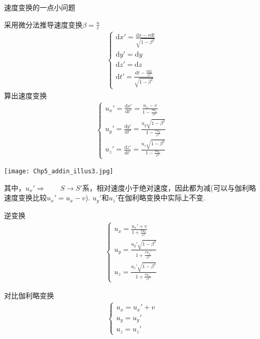 \documentclass[a4paper, opensource]{./template/qyxf-book}
\newcommand{\di}[1]{\mathrm{d}#1}
\begin{document}
\begin{section}{速度变换的一点小问题}
\begin{multicols}{2}
采用微分法推导速度变换\hspace{2em}$\beta=\frac{u}{c}$
\begin{align*}
\begin{cases}
\di x'=\frac{\di x-v\di t}{\sqrt{1-\beta^2}}\\[6pt]
\di y'=\di y\\[6pt]
\di z'=\di z\\[6pt]
\di t'=\frac{\di t-\frac{v\di x}{c^2}}{\sqrt{1-\beta^2}}
\end{cases}
\end{align*}
算出速度变换
\begin{align*}
\begin{cases}
u_x'=\frac{\di x'}{\di t'}=\frac{u_x-v}{1-\frac{vu_x}{c^2}}\\[6pt]
u_y'=\frac{\di y'}{\di t'}=\frac{u_y\sqrt{1-\beta^2}}{1-\frac{vu_x}{c^2}}\\[6pt]
u_z'=\frac{\di z'}{\di t'}=\frac{u_z\sqrt{1-\beta^2}}{1-\frac{vu_x}{c^2}}
\end{cases}
\end{align*}

\hspace{4em}
\texttt{[image: Chp5\_addin\_illus3.jpg]}
\end{multicols}
其中，$u_x'\Rightarrow\hspace{2em} S\rightarrow S'$系，相对速度小于绝对速度，因此都为减(可以与伽利略速度变换比较$u_x'=u_x-v$).
$u_y'$和$u_z'$在伽利略变换中实际上不变.

逆变换
\begin{align*}
\begin{cases}
u_x=\frac{u_x'+v}{1+\frac{vu_x}{c^2}}\\[6pt]
u_y=\frac{u_y'\sqrt{1-\beta^2}}{1+\frac{vu_y'}{c^2}}\\[6pt]
u_z=\frac{u_z'\sqrt{1-\beta^2}}{1+\frac{vu_z'}{c^2}}
\end{cases}
\end{align*}

对比伽利略变换
\begin{align*}
\begin{cases}
u_x=u_x'+v\\
u_y=u_y'\\
u_z=u_z'
\end{cases}
\end{align*}
\end{section}
\end{document}
